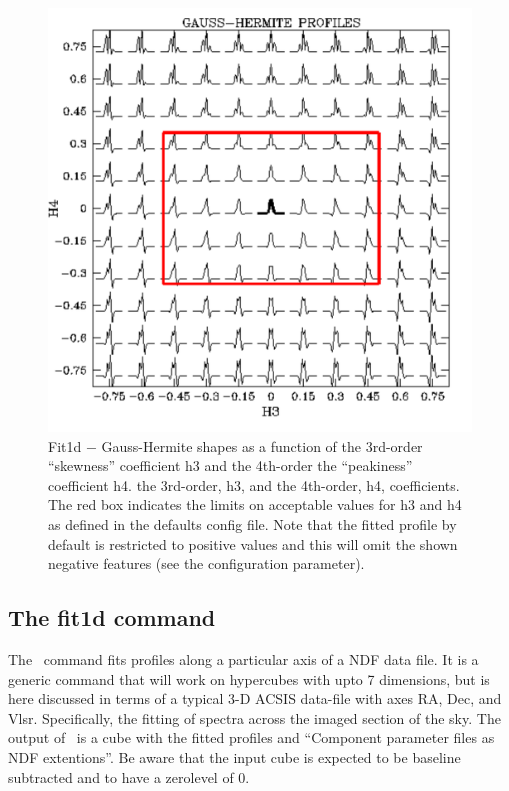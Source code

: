 \documentclass[oneside,11pt]{starlink}
\begin{document}
\begin{figure}[htb]
  \begin{center}
    \includegraphics[width=0.8\linewidth]{sun258_gaussherm}
    \caption[Gauss-Hermite shapes]{Fit1d $-$ Gauss-Hermite shapes as a function of the 3rd-order
      ``skewness'' coefficient h3 and the 4th-order the ``peakiness''
      coefficient h4.  the 3rd-order, h3, and the 4th-order, h4,
      coefficients. The red box indicates the limits on acceptable
      values for h3 and h4 as defined in the defaults config file. Note
      that the fitted profile by default is restricted to positive values
      and this will omit the shown negative features (see
      the  configuration parameter).}
    \label{fig:gaussherm}
  \end{center}
\end{figure}

\subsection{The fit1d command}

The \fitdd\ command fits profiles along a particular axis of a NDF
data file.  It is a generic command that will work on hypercubes with
upto 7 dimensions, but is here discussed in terms of a typical 3-D
ACSIS data-file with axes RA, Dec, and Vlsr. Specifically, the fitting
of spectra across the imaged section of the sky. The output of \fitdd\
is a cube with the fitted profiles and ``Component parameter files as
NDF extentions''. Be aware that the input cube is expected to be
baseline subtracted and to have a zerolevel of 0.
\end{document}
